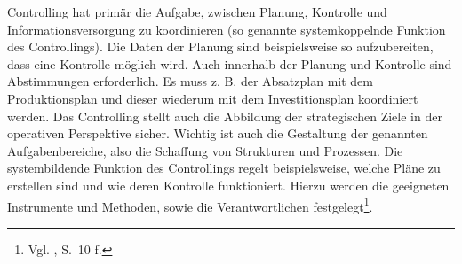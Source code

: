Controlling hat primär die Aufgabe, zwischen Planung, Kontrolle und Informationsversorgung zu koordinieren (so genannte systemkoppelnde Funktion des Controllings). Die Daten der Planung sind beispielsweise so aufzubereiten, dass eine Kontrolle möglich wird.  Auch innerhalb der Planung und Kontrolle sind Abstimmungen erforderlich. Es muss z. B. der Absatzplan mit dem Produktionsplan und dieser wiederum mit dem Investitionsplan koordiniert werden. Das Controlling stellt auch die Abbildung der strategischen Ziele in der operativen Perspektive sicher. Wichtig ist auch die Gestaltung der genannten Aufgabenbereiche, also die Schaffung von Strukturen und Prozessen. Die systembildende Funktion des Controllings regelt beispielsweise, welche Pläne zu erstellen sind und wie deren Kontrolle funktioniert. Hierzu werden die geeigneten Instrumente und Methoden, sowie die Verantwortlichen festgelegt\footnote{Vgl. \cite{Fiedler2008}, S.~10 f.}.
